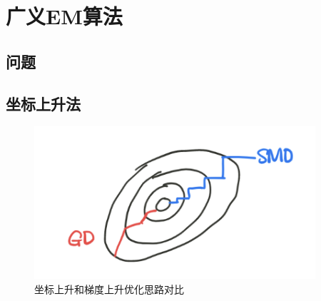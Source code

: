 \chapter{广义EM算法}

\section{问题}

\section{坐标上升法}

\begin{figure}[H]
    \centering
    \includegraphics[scale=0.6]{figures/坐标上升法.png}
    \caption{坐标上升和梯度上升优化思路对比}
\end{figure}